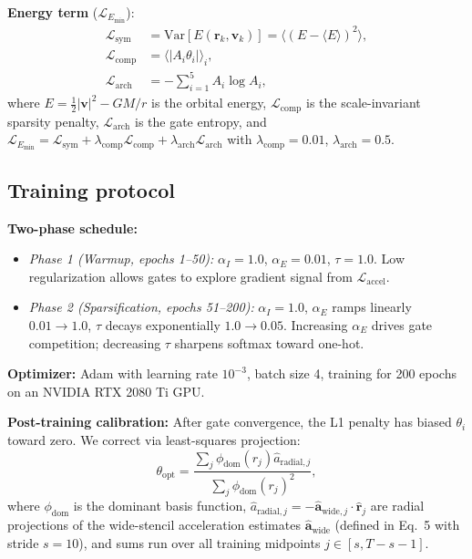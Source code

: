 \documentclass[aps,pre,reprint,superscriptaddress,longbibliography]{revtex4-2}
\begin{document}
\textbf{Energy term} ($\mathcal{L}_{E_{\min}}$):
\begin{align}
\mathcal{L}_{\text{sym}} &= \text{Var}[E(\mathbf{r}_k, \mathbf{v}_k)] = \langle (E - \langle E \rangle)^2 \rangle, \\
\mathcal{L}_{\text{comp}} &= \langle |A_i \theta_i| \rangle_i, \\
\mathcal{L}_{\text{arch}} &= -\sum_{i=1}^5 A_i \log A_i,
\end{align}
where $E = \tfrac{1}{2}|\mathbf{v}|^2 - GM/r$ is the orbital energy, $\mathcal{L}_{\text{comp}}$ is the scale-invariant sparsity penalty, $\mathcal{L}_{\text{arch}}$ is the gate entropy, and $\mathcal{L}_{E_{\min}} = \mathcal{L}_{\text{sym}} + \lambda_{\text{comp}} \mathcal{L}_{\text{comp}} + \lambda_{\text{arch}} \mathcal{L}_{\text{arch}}$ with $\lambda_{\text{comp}} = 0.01$, $\lambda_{\text{arch}} = 0.5$.

\subsection{Training protocol}
\textbf{Two-phase schedule:}
\begin{itemize}
\item \textit{Phase 1 (Warmup, epochs 1--50):} $\alpha_I = 1.0$, $\alpha_E = 0.01$, $\tau = 1.0$. Low regularization allows gates to explore gradient signal from $\mathcal{L}_{\text{accel}}$.
\item \textit{Phase 2 (Sparsification, epochs 51--200):} $\alpha_I = 1.0$, $\alpha_E$ ramps linearly $0.01 \to 1.0$, $\tau$ decays exponentially $1.0 \to 0.05$. Increasing $\alpha_E$ drives gate competition; decreasing $\tau$ sharpens softmax toward one-hot.
\end{itemize}

\textbf{Optimizer:} Adam with learning rate $10^{-3}$, batch size 4, training for 200 epochs on an NVIDIA RTX 2080 Ti GPU.

\textbf{Post-training calibration:} After gate convergence, the L1 penalty has biased $\theta_i$ toward zero. We correct via least-squares projection:
\begin{equation}
\theta_{\text{opt}} = \frac{\sum_j \phi_{\text{dom}}(r_j) \hat{a}_{\text{radial},j}}{\sum_j \phi_{\text{dom}}(r_j)^2},
\end{equation}
where $\phi_{\text{dom}}$ is the dominant basis function, $\hat{a}_{\text{radial},j} = -\hat{\mathbf{a}}_{\text{wide},j} \cdot \hat{\mathbf{r}}_j$ are radial projections of the wide-stencil acceleration estimates $\hat{\mathbf{a}}_{\text{wide}}$ (defined in Eq.~5 with stride $s=10$), and sums run over all training midpoints $j \in [s, T-s-1]$.
\end{document}
